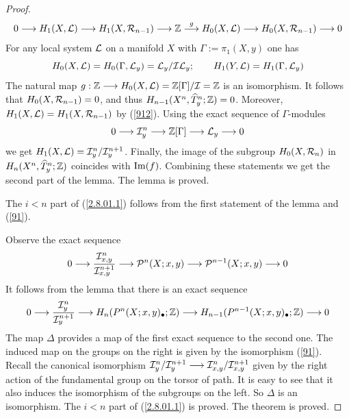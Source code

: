\documentclass[10pt]{article}
\begin{document}
\begin{proof}
\begin{equation} \label{912}
0  \longrightarrow H_1(X, {\cal L}) \longrightarrow H_1(X, {\cal R}_{n-1}) \longrightarrow 
  {\mathbb Z} \stackrel{g}{\longrightarrow} 
H_0(X, {\cal L}) \longrightarrow H_0(X, {\cal R}_{n-1})\longrightarrow 0
\end{equation}
For any local system ${\cal L}$ on a manifold $X$ with $\Gamma:= \pi_1(X,y)$ one has 
\begin{equation} \label{912*}
H_0(X, {\cal L}) = H_0(\Gamma, {\cal L}_y) = {\cal L}_y/{\cal I}{\cal L}_y; \qquad 
H_1(Y, {\cal L}) = H_1(\Gamma, {\cal L}_y)
\end{equation}
The natural map $g: {\mathbb Z}  \longrightarrow H_0(X, {\cal L}) = {\mathbb Z}[\Gamma]/{\cal I} = {\mathbb Z}$ 
is an isomorphism. It follows that $H_0(X, {\cal R}_{n-1})= 0$, and thus 
$H_{n-1}(X^n,  \widehat T_y^n; {\mathbb Z}) =0$. 
Moreover, $H_1(X, {\cal L}) = H_1(X, {\cal R}_{n-1})$ by (\ref{912}). 
Using the exact sequence of $\Gamma$-modules 
$$
0 \longrightarrow {\cal I}_y^n \longrightarrow {\mathbb Z}[\Gamma] \longrightarrow {\cal L}_y \longrightarrow  0 
$$
we get $H_1(X, {\cal L}) = {\cal I}_y^n/{\cal I}_y^{n+1}$. Finally, 
the image of the subgroup $H_{0}(X,  {\cal R}_n)$ in $H_n(X^n,  \widehat T_y^n; {\mathbb Z})$
coincides with ${\rm Im}(f)$. Combining these statements we get the second part of the lemma. 
The lemma is proved. 

The $i<n$ part  of (\ref{2.8.01.1}) 
follows from the first statement of the lemma and (\ref{91}).
 
Observe the exact sequence
\begin{equation} \label{2.13.01.11}
0 \longrightarrow \frac{{\cal I}^n_{x,y}}{{\cal I}^{n+1}_{x,y}} \longrightarrow {\cal P}^n(X; x,y) 
\longrightarrow {\cal P}^{n-1}(X; x,y)
 \longrightarrow  0 
\end{equation}
It follows from the lemma that there is an exact sequence
\begin{equation} \label{2.13.01.10}
0 \longrightarrow \frac{{\cal I}^n_{y}}{{\cal I}^{n+1}_{y}} \longrightarrow  H_{n}(P^n(X; x,y)_{\bullet}; {\mathbb Z})
\longrightarrow H_{n-1}(P^{n-1}(X; x,y)_{\bullet}; {\mathbb Z})
 \longrightarrow  0 
\end{equation}
The map $\Delta$ provides a map of the first exact sequence to the second one. 
The induced map on the groups on the right is given by the isomorphism (\ref{91}). 
Recall  the canonical isomorphism 
${\cal I}^n_{y}/{\cal I}^{n+1}_{y} \longrightarrow {\cal I}^n_{x,y}/{\cal I}^{n+1}_{x,y}$ 
given by the right action of the fundamental group on the torsor of path. 
It is easy to see that it also induces the isomorphism of the subgroups on the left. 
So $\Delta$ 
is an isomorphism. The $i<n$ part  of (\ref{2.8.01.1}) is proved. 
The theorem is proved. 



\end{proof}
\end{document}
